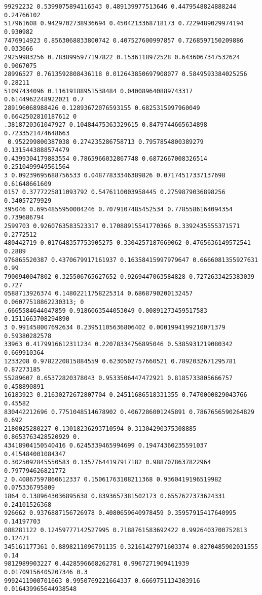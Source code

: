 \documentclass[12pt,a4paper]{article}
\begin{document}
\begin{lstlisting}
99292232 0.5399075894116543 0.489139977513646 0.4479548824888244 0.24766102
517961608 0.9429702738936694 0.4504213368718173 0.7229489029974194 0.930982
7476914923 0.8563068833800742 0.407527600997857 0.7268597150209886 0.033666
29259983256 0.7838995977197822 0.1536118972528 0.6436067347532624 0.9067075
28996527 0.7613592808436118 0.012643850697908077 0.5849593384025256 0.28211
51097434096 0.11619188951538484 0.040089640889743317 0.6144962248922021 0.7
289196068988426 0.12893672076593155 0.6825315997960049 0.6642502810187612 0
.3818720361047927 0.10484475363329615 0.8479744665634898 0.7233521474648663
 0.952299800387038 0.274235286758713 0.7957854800389279 0.1315443888574479 
0.4399304179883554 0.7865966032867748 0.6872667008326514 0.2510499949561564
3 0.09239695688756533 0.04877833346389826 0.07174517337137698 0.61648661609
0157 0.3777225811093792 0.5476110003958445 0.2759879036898256 0.34057279929
395046 0.6954855950004246 0.7079107485452534 0.7785586164094354 0.739686794
2599703 0.9260763583523317 0.17088915541770366 0.3392435555371571 0.2772512
480442719 0.017648357753905275 0.3304257187669062 0.4765636149572541 0.2889
976865520387 0.4370679917161937 0.16358415997979647 0.6666081355927631 0.99
7900940047802 0.325506765627652 0.9269447063584828 0.7272633425383039 0.727
0588713926374 0.14802211758225314 0.6868790200132457 0.06077518862230313; 0
.6665584644047859 0.9186063544053049 0.00891273459517583 0.1511663708294890
3 0.991458007692634 0.23951105636806402 0.0001994199210071379 0.59380282578
33963 0.4179916612311234 0.22078334756895046 0.5385931219080342 0.669910364
1233208 0.9782220815884559 0.6230502757660521 0.7892032671295781 0.87273185
55289607 0.65372820378043 0.9533506447472921 0.8185733805666757 0.458890891
16183923 0.21630272672807704 0.24511686518331355 0.7470000829043766 0.45582
830442212696 0.7751048514678902 0.4067286001245891 0.7867656590264829 0.692
2180025280227 0.13018236293710594 0.31304290375308885 0.8653763428520929 0.
43418904150540416 0.6245339465994699 0.19474360235591037 0.415484001084347 
0.3025092845550583 0.13577644197917182 0.9887078637822964 0.797794626821772
2 0.40867597860612337 0.15061763108211368 0.9360419196519982 0.075336795809
1864 0.1389643036895638 0.8393657381502173 0.6557627373624331 0.24101526368
926662 0.9376887156726978 0.4080659640978459 0.35957915417640995 0.14197703
088281122 0.12459777142527995 0.7188761583692422 0.9926403700752813 0.12471
345161177361 0.8898211096791135 0.32161427971603374 0.8270485902031555 0.14
9812989903227 0.4428596668262781 0.9967271909411939 0.01709156405207346 0.3
9992411900701663 0.9950769221664337 0.6669751134303916 0.016439965644938548

\end{lstlisting}
\end{document}
